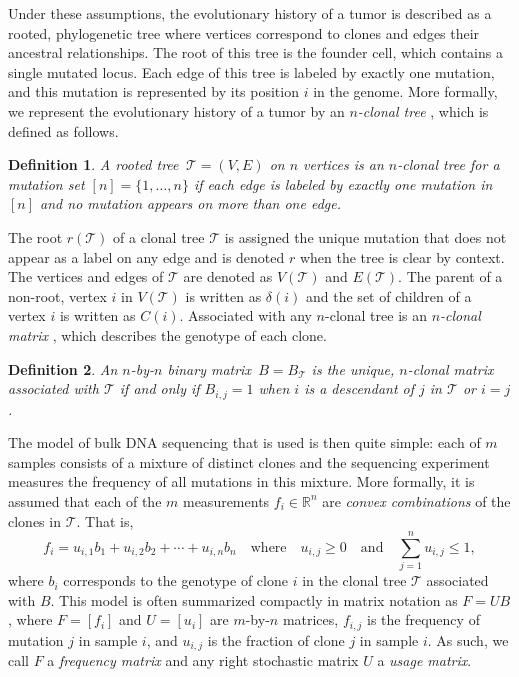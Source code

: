 \documentclass[10pt]{article}
\newtheorem{definition}{Definition}
\newcommand{\tree}{\mathcal{T}}
\begin{document}
Under these assumptions, the evolutionary history of a tumor is described as a rooted, phylogenetic tree 
where vertices correspond to clones and edges their ancestral 
relationships. The root of this tree is the founder cell, which contains a single mutated locus. 
Each edge of this tree is labeled by exactly one mutation, and this mutation is represented by its 
position $i$ in the genome. More formally, we represent the evolutionary history of a tumor by an 
\emph{$n$-clonal tree} \cite{el-kebir_reconstruction_2015}, which is defined as 
follows.

\begin{definition}
  A rooted tree $\,\tree = (V, E)$ on $n$ vertices is an $n$-clonal tree 
  for a mutation set $[n] = \{1, \ldots, n\}$ if each edge is
  labeled by exactly one mutation in $[n]$ and no mutation appears
  on more than one edge.
\end{definition}

The root $r(\tree)$ of a clonal tree $\tree$ is assigned the unique 
mutation that does not appear as a label on any edge and is denoted
$r$ when the tree is clear by context. The vertices and edges of $\tree$ are denoted as $V(\tree)$ and $E(\tree)$.
The parent of a non-root, vertex $i$ in $V(\tree)$ is written as $\delta(i)$ and the set of children of a vertex $i$ 
is written as $C(i)$. Associated with any $n$-clonal tree is an \emph{$n$-clonal matrix} \cite{el-kebir_reconstruction_2015}, 
which describes the genotype of each clone. 

\begin{definition}
    An $n$-by-$n$ binary matrix $\,B = B_{\tree}$ is the unique, $n$-clonal matrix associated with $\tree$ 
  if and only if $B_{i, j} = 1$ when $i$ is a descendant of $j$ in $\tree$ or 
  $i = j$.
\end{definition}

The model of bulk DNA sequencing that is used is then quite simple: each of $m$ samples 
consists of a mixture of distinct clones and the sequencing experiment measures the 
frequency of all mutations in this mixture. More formally, it is assumed that 
each of the $m$ measurements $f_i \in \mathbb{R}^n$ are \emph{convex combinations} of the clones
in $\tree$. That is,
\[f_i = u_{i,1}b_1 + u_{i,2}b_2 + \cdots + u_{i,n}b_n \quad\text{where}\quad u_{i, j} \geq 0 \quad\text{and}\quad \sum_{j=1}^nu_{i, j} \leq 1,\]
where $b_i$ corresponds to the genotype of clone $i$ in the clonal tree $\tree$ associated with $B$.
This model is often summarized compactly in matrix notation as $F = UB$, where $F = [f_i]$ and $U = [u_i]$ are $m$-by-$n$ matrices, 
$f_{i,j}$ is the frequency of mutation $j$ in sample $i$, and $u_{i,j}$ is the fraction of clone $j$ in sample $i$. As such, we
call $F$ a \emph{frequency matrix} and any right stochastic matrix $U$ a \emph{usage matrix}.
\end{document}
